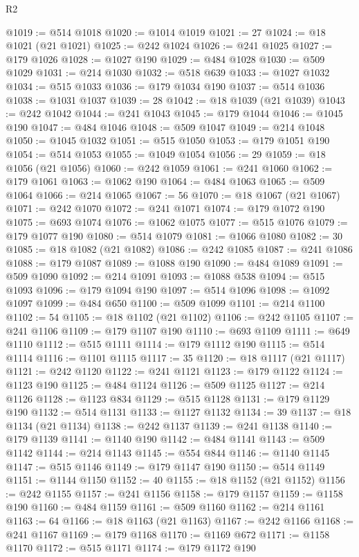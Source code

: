 \begin{lexlean}{R2}
\begin{coremodule}
@1019 := @514 @1018
@1020 := @1014 @1019
@1021 := 27
@1024 := @18 @1021 (@21 @1021)
@1025 := @242 @1024
@1026 := @241 @1025
@1027 := @179 @1026
@1028 := @1027 @190
@1029 := @484 @1028
@1030 := @509 @1029
@1031 := @214 @1030
@1032 := @518 @639
@1033 := @1027 @1032
@1034 := @515 @1033
@1036 := @179 @1034 @190
@1037 := @514 @1036
@1038 := @1031 @1037
@1039 := 28
@1042 := @18 @1039 (@21 @1039)
@1043 := @242 @1042
@1044 := @241 @1043
@1045 := @179 @1044
@1046 := @1045 @190
@1047 := @484 @1046
@1048 := @509 @1047
@1049 := @214 @1048
@1050 := @1045 @1032
@1051 := @515 @1050
@1053 := @179 @1051 @190
@1054 := @514 @1053
@1055 := @1049 @1054
@1056 := 29
@1059 := @18 @1056 (@21 @1056)
@1060 := @242 @1059
@1061 := @241 @1060
@1062 := @179 @1061
@1063 := @1062 @190
@1064 := @484 @1063
@1065 := @509 @1064
@1066 := @214 @1065
@1067 := 56
@1070 := @18 @1067 (@21 @1067)
@1071 := @242 @1070
@1072 := @241 @1071
@1074 := @179 @1072 @190
@1075 := @693 @1074
@1076 := @1062 @1075
@1077 := @515 @1076
@1079 := @179 @1077 @190
@1080 := @514 @1079
@1081 := @1066 @1080
@1082 := 30
@1085 := @18 @1082 (@21 @1082)
@1086 := @242 @1085
@1087 := @241 @1086
@1088 := @179 @1087
@1089 := @1088 @190
@1090 := @484 @1089
@1091 := @509 @1090
@1092 := @214 @1091
@1093 := @1088 @538
@1094 := @515 @1093
@1096 := @179 @1094 @190
@1097 := @514 @1096
@1098 := @1092 @1097
@1099 := @484 @650
@1100 := @509 @1099
@1101 := @214 @1100
@1102 := 54
@1105 := @18 @1102 (@21 @1102)
@1106 := @242 @1105
@1107 := @241 @1106
@1109 := @179 @1107 @190
@1110 := @693 @1109
@1111 := @649 @1110
@1112 := @515 @1111
@1114 := @179 @1112 @190
@1115 := @514 @1114
@1116 := @1101 @1115
@1117 := 35
@1120 := @18 @1117 (@21 @1117)
@1121 := @242 @1120
@1122 := @241 @1121
@1123 := @179 @1122
@1124 := @1123 @190
@1125 := @484 @1124
@1126 := @509 @1125
@1127 := @214 @1126
@1128 := @1123 @834
@1129 := @515 @1128
@1131 := @179 @1129 @190
@1132 := @514 @1131
@1133 := @1127 @1132
@1134 := 39
@1137 := @18 @1134 (@21 @1134)
@1138 := @242 @1137
@1139 := @241 @1138
@1140 := @179 @1139
@1141 := @1140 @190
@1142 := @484 @1141
@1143 := @509 @1142
@1144 := @214 @1143
@1145 := @554 @844
@1146 := @1140 @1145
@1147 := @515 @1146
@1149 := @179 @1147 @190
@1150 := @514 @1149
@1151 := @1144 @1150
@1152 := 40
@1155 := @18 @1152 (@21 @1152)
@1156 := @242 @1155
@1157 := @241 @1156
@1158 := @179 @1157
@1159 := @1158 @190
@1160 := @484 @1159
@1161 := @509 @1160
@1162 := @214 @1161
@1163 := 64
@1166 := @18 @1163 (@21 @1163)
@1167 := @242 @1166
@1168 := @241 @1167
@1169 := @179 @1168
@1170 := @1169 @672
@1171 := @1158 @1170
@1172 := @515 @1171
@1174 := @179 @1172 @190

\end{coremodule}
\end{lexlean}
